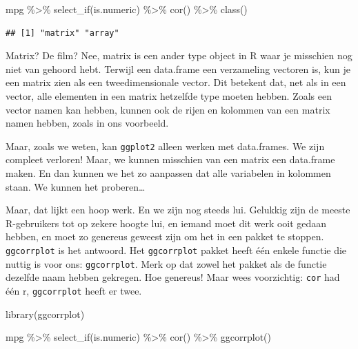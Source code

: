\documentclass[]{tufte-book}
\newenvironment{Shaded}{}{}
\newcommand{\FunctionTok}[1]{\textcolor[rgb]{0.02,0.16,0.49}{#1}}
\newcommand{\NormalTok}[1]{#1}
\newcommand{\SpecialCharTok}[1]{\textcolor[rgb]{0.25,0.44,0.63}{#1}}
\begin{document}
\begin{Shaded}
\begin{Highlighting}[]
\NormalTok{mpg }\SpecialCharTok{\%\textgreater{}\%}
  \FunctionTok{select\_if}\NormalTok{(is.numeric) }\SpecialCharTok{\%\textgreater{}\%}
  \FunctionTok{cor}\NormalTok{() }\SpecialCharTok{\%\textgreater{}\%}
  \FunctionTok{class}\NormalTok{()}
\end{Highlighting}
\end{Shaded}

\begin{verbatim}
## [1] "matrix" "array"
\end{verbatim}

Matrix? De film? Nee, matrix is een ander type object in R waar je misschien nog niet van gehoord hebt. Terwijl een data.frame een verzameling vectoren is, kun je een matrix zien als een tweedimensionale vector. Dit betekent dat, net als in een vector, alle elementen in een matrix hetzelfde type moeten hebben. Zoals een vector namen kan hebben, kunnen ook de rijen en kolommen van een matrix namen hebben, zoals in ons voorbeeld.

Maar, zoals we weten, kan \texttt{ggplot2} alleen werken met data.frames. We zijn compleet verloren! Maar, we kunnen misschien van een matrix een data.frame maken. En dan kunnen we het zo aanpassen dat alle variabelen in kolommen staan. We kunnen het proberen\ldots{}

Maar, dat lijkt een hoop werk. En we zijn nog steeds lui. Gelukkig zijn de meeste R-gebruikers tot op zekere hoogte lui, en iemand moet dit werk ooit gedaan hebben, en moet zo genereus geweest zijn om het in een pakket te stoppen. \texttt{ggcorrplot} is het antwoord. Het \texttt{ggcorrplot} pakket heeft één enkele functie die nuttig is voor ons: \texttt{ggcorrplot}. Merk op dat zowel het pakket als de functie dezelfde naam hebben gekregen. Hoe genereus! Maar wees voorzichtig: \texttt{cor} had één r, \texttt{ggcorrplot} heeft er twee.

\begin{Shaded}
\begin{Highlighting}[]
\FunctionTok{library}\NormalTok{(ggcorrplot)}
\end{Highlighting}
\end{Shaded}

\begin{Shaded}
\begin{Highlighting}[]
\NormalTok{mpg }\SpecialCharTok{\%\textgreater{}\%}
  \FunctionTok{select\_if}\NormalTok{(is.numeric) }\SpecialCharTok{\%\textgreater{}\%}
  \FunctionTok{cor}\NormalTok{() }\SpecialCharTok{\%\textgreater{}\%}
  \FunctionTok{ggcorrplot}\NormalTok{()}
\end{Highlighting}
\end{Shaded}
\end{document}
